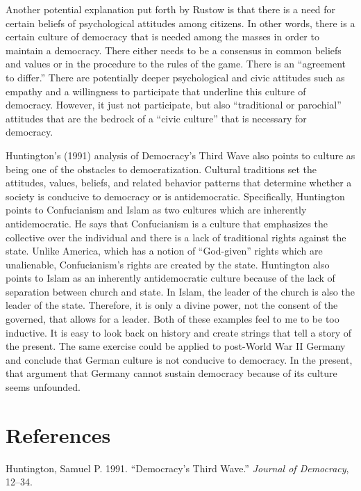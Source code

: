 \documentclass[12pt,]{article}
\begin{document}
Another potential explanation put forth by Rustow is that there is a
need for certain beliefs of psychological attitudes among citizens. In
other words, there is a certain culture of democracy that is needed
among the masses in order to maintain a democracy. There either needs to
be a consensus in common beliefs and values or in the procedure to the
rules of the game. There is an ``agreement to differ.'' There are
potentially deeper psychological and civic attitudes such as empathy and
a willingness to participate that underline this culture of democracy.
However, it just not participate, but also ``traditional or parochial''
attitudes that are the bedrock of a ``civic culture'' that is necessary
for democracy.

Huntington's (1991) analysis of Democracy's Third Wave also points to
culture as being one of the obstacles to democratization. Cultural
traditions set the attitudes, values, beliefs, and related behavior
patterns that determine whether a society is conducive to democracy or
is antidemocratic. Specifically, Huntington points to Confucianism and
Islam as two cultures which are inherently antidemocratic. He says that
Confucianism is a culture that emphasizes the collective over the
individual and there is a lack of traditional rights against the state.
Unlike America, which has a notion of ``God-given'' rights which are
unalienable, Confucianism's rights are created by the state. Huntington
also points to Islam as an inherently antidemocratic culture because of
the lack of separation between church and state. In Islam, the leader of
the church is also the leader of the state. Therefore, it is only a
divine power, not the consent of the governed, that allows for a leader.
Both of these examples feel to me to be too inductive. It is easy to
look back on history and create strings that tell a story of the
present. The same exercise could be applied to post-World War II Germany
and conclude that German culture is not conducive to democracy. In the
present, that argument that Germany cannot sustain democracy because of
its culture seems unfounded.

\hypertarget{references}{%
\section*{References}\label{references}}

\hypertarget{refs}{}
\leavevmode\hypertarget{ref-huntington}{}%
Huntington, Samuel P. 1991. ``Democracy's Third Wave.'' \emph{Journal of
Democracy}, 12--34.
\end{document}
